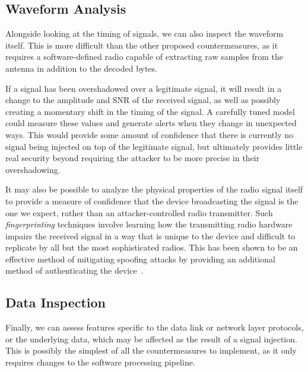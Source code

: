 \subsection{Waveform Analysis}

Alongside looking at the timing of signals, we can also inspect the waveform itself.
This is more difficult than the other proposed countermeasures, as it requires a software-defined radio capable of extracting raw samples from the antenna in addition to the decoded bytes.

If a signal has been overshadowed over a legitimate signal, it will result in a change to the amplitude and SNR of the received signal, as well as possibly creating a momentary shift in the timing of the signal.
A carefully tuned model could measure these values and generate alerts when they change in unexpected ways.
This would provide some amount of confidence that there is currently no signal being injected on top of the legitimate signal, but ultimately provides little real security beyond requiring the attacker to be more precise in their overshadowing.

It may also be possible to analyze the physical properties of the radio signal itself to provide a measure of confidence that the device broadcasting the signal is the one we expect, rather than an attacker-controlled radio transmitter.
Such \textit{fingerprinting} techniques involve learning how the transmitting radio hardware impairs the received signal in a way that is unique to the device and difficult to replicate by all but the most sophisticated radios.
This has been shown to be an effective method of mitigating spoofing attacks by providing an additional method of authenticating the device~\cite{sankheNo2020,oligeri2020past}.


\subsection{Data Inspection}

Finally, we can assess features specific to the data link or network layer protocols, or the underlying data, which may be affected as the result of a signal injection.
This is possibly the simplest of all the countermeasures to implement, as it only requires changes to the software processing pipeline.

